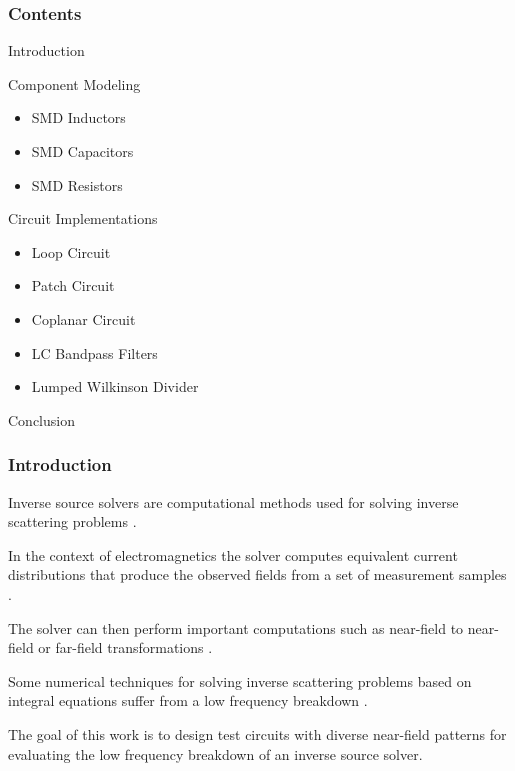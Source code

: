 \begin{frame}
    \frametitle{Contents}
    \phantom{Spacing}
	\begin{PraesentationAufzaehlung}
		\item Introduction
		\item Component Modeling
		\begin{itemize}
			\item SMD Inductors
			\item SMD Capacitors
			\item SMD Resistors
		\end{itemize}
		\item Circuit Implementations
		\begin{itemize}
			\item Loop Circuit
			\item Patch Circuit
			\item Coplanar Circuit
			\item LC Bandpass Filters
			\item Lumped Wilkinson Divider
		\end{itemize}	
		\item Conclusion
	\end{PraesentationAufzaehlung}
\end{frame}

\begin{frame}
	\frametitle{Introduction}
	 Inverse source solvers are computational methods used for solving inverse scattering problems \cite{381063}.
	 
	 In the context of electromagnetics the solver computes equivalent current distributions that produce the observed fields from a set of measurement samples \cite{4812237}.
	 
	 The solver can then perform important computations such as near-field to near-field or far-field transformations \cite{4812237}.
	 
	 Some numerical techniques for solving inverse scattering problems based on integral equations suffer from a low frequency breakdown \cite{8293221}.
	 
	 \textcolor{TUMBlau}{The goal of this work is to design test circuits with diverse near-field patterns for evaluating the low frequency breakdown of an inverse source solver.}
\end{frame}

